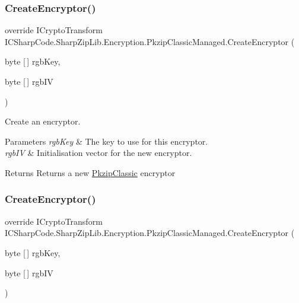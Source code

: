 \subsubsection{\texorpdfstring{Create\+Encryptor()}{CreateEncryptor()}\hspace{0.1cm}{\footnotesize\ttfamily [1/2]}}
{\footnotesize\ttfamily override I\+Crypto\+Transform I\+C\+Sharp\+Code.\+Sharp\+Zip\+Lib.\+Encryption.\+Pkzip\+Classic\+Managed.\+Create\+Encryptor (\begin{DoxyParamCaption}\item[{byte \mbox{[}$\,$\mbox{]}}]{rgb\+Key,  }\item[{byte \mbox{[}$\,$\mbox{]}}]{rgb\+IV }\end{DoxyParamCaption})\hspace{0.3cm}{\ttfamily [inline]}}



Create an encryptor. 


\begin{DoxyParams}{Parameters}
{\em rgb\+Key} & The key to use for this encryptor.\\
\hline
{\em rgb\+IV} & Initialisation vector for the new encryptor.\\
\hline
\end{DoxyParams}
\begin{DoxyReturn}{Returns}
Returns a new \hyperlink{class_i_c_sharp_code_1_1_sharp_zip_lib_1_1_encryption_1_1_pkzip_classic}{Pkzip\+Classic} encryptor
\end{DoxyReturn}
\mbox{\label{class_i_c_sharp_code_1_1_sharp_zip_lib_1_1_encryption_1_1_pkzip_classic_managed_ade8d45e69497dfb1050df2d7b4d965a0}} 
\subsubsection{\texorpdfstring{Create\+Encryptor()}{CreateEncryptor()}\hspace{0.1cm}{\footnotesize\ttfamily [2/2]}}
{\footnotesize\ttfamily override I\+Crypto\+Transform I\+C\+Sharp\+Code.\+Sharp\+Zip\+Lib.\+Encryption.\+Pkzip\+Classic\+Managed.\+Create\+Encryptor (\begin{DoxyParamCaption}\item[{byte \mbox{[}$\,$\mbox{]}}]{rgb\+Key,  }\item[{byte \mbox{[}$\,$\mbox{]}}]{rgb\+IV }\end{DoxyParamCaption})\hspace{0.3cm}{\ttfamily [inline]}}



